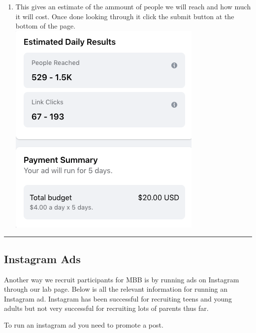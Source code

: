 \documentclass[]{book}
\providecommand{\tightlist}{%
  \setlength{\itemsep}{0pt}\setlength{\parskip}{0pt}}
\begin{document}
\begin{enumerate}
\def\labelenumi{\arabic{enumi}.}
\setcounter{enumi}{10}
\tightlist
\item
  This gives an estimate of the ammount of people we will reach and how much it will cost. Once done looking through it click the submit button at the bottom of the page.
  \includegraphics{images/lab_protocols/fb_ads/11.png}
\end{enumerate}

\begin{center}\rule{0.5\linewidth}{0.5pt}\end{center}

\hypertarget{instagram-ads}{%
\subsection{Instagram Ads}\label{instagram-ads}}

Another way we recruit participants for MBB is by running ads on Instagram through our lab page. Below is all the relevant information for running an Instagram ad. Instagram has been successful for recruiting teens and young adults but not very successful for recruiting lots of parents thus far.

To run an instagram ad you need to promote a post.
\end{document}
